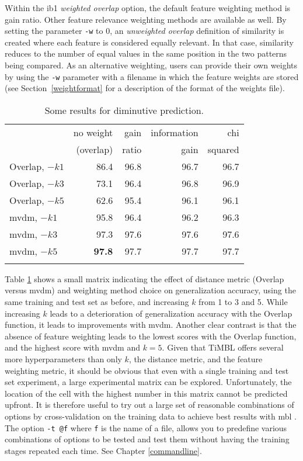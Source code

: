 \documentclass{report}
\begin{document}
Within the {\sc ib1} {\em weighted overlap}\/ option, the default
feature weighting method is gain ratio. Other feature relevance
weighting methods are available as well.  By setting the parameter
{\tt -w} to 0, an {\em unweighted overlap}\/ definition of similarity is created
where each feature is considered equally relevant. In that case, similarity reduces
to the number of equal values in the same position in the
two patterns being compared. As an alternative weighting, users can
provide their own weights by using the {\tt -w} parameter with a
filename in which the feature weights are stored (see
Section~\ref{weightformat} for a description of the format of the
weights file).

\begin{table}
\begin{center}
\begin{tabular}{l|rrrr}
             & no weight & gain  & information & chi    \\
             & (overlap) & ratio & gain        & squared \\
\noalign{\smallskip}
\hline
\noalign{\smallskip}
Overlap,  $-k1$ & 86.4 & 96.8 & 96.7 & 96.7 \\
Overlap,  $-k3$ & 73.1 & 96.4 & 96.8 & 96.9 \\
Overlap,  $-k5$ & 62.6 & 95.4 & 96.1 & 96.1 \\
\hline
\noalign{\smallskip}
{\sc mvdm}, $-k1$ & 95.8 & 96.4 & 96.2 & 96.3 \\
{\sc mvdm}, $-k3$ & 97.3 & 97.6 & 97.6 & 97.6 \\
{\sc mvdm}, $-k5$ & {\bf 97.8} & 97.7 & 97.7 & 97.7 \\
\hline
\noalign{\smallskip}
\end{tabular}
\caption{Some results for diminutive prediction.}
\label{diminresults}
\end{center}
\end{table}

Table \ref{diminresults} shows a small matrix indicating the effect of
distance metric (Overlap versus {\sc mvdm}) and weighting method
choice on generalization accuracy, using the same training and test
set as before, and increasing $k$ from 1 to 3 and 5. While increasing
$k$ leads to a deterioration of generalization accuracy with the
Overlap function, it leads to improvements with {\sc mvdm}. Another
clear contrast is that the absence of feature weighting leads to the
lowest scores with the Overlap function, and the highest score with
{\sc mvdm} and $k=5$. Given that TiMBL offers several more
hyperparameters than only $k$, the distance metric, and the feature
weighting metric, it should be obvious that even with a single
training and test set experiment, a large experimental matrix can be
explored. Unfortunately, the location of the cell with the highest
number in this matrix cannot be predicted upfront. It is therefore
useful to try out a large set of reasonable combinations of options by
cross-validation on the training data to achieve best results with
{\sc mbl} \cite{VandenBosch04b}. The option {\tt -t @f} where {\tt f}
is the name of a file, allows you to predefine various combinations of
options to be tested and test them without having the training stages
repeated each time. See Chapter \ref{commandline}.
\end{document}
